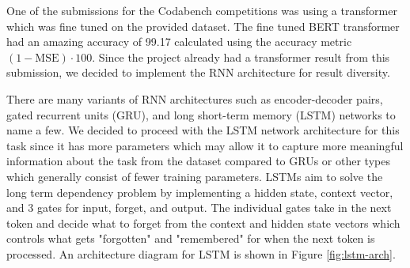 \documentclass[11pt]{article}
\begin{document}
One of the submissions for the Codabench competitions was using a transformer which was fine tuned on 
the provided dataset. The fine tuned BERT transformer had an amazing accuracy of 99.17 calculated using the
accuracy metric \((1 - \text{MSE}) \cdot 100\). Since the project already had a transformer result from
this submission, we decided to implement the RNN architecture for result diversity. 
\bigskip

There are many variants of RNN architectures such as encoder-decoder pairs, gated recurrent units (GRU), 
and long short-term memory (LSTM) networks to name a few. We decided to proceed with the LSTM network 
architecture for this task since it has more parameters which may allow it to capture more meaningful information 
about the task from the dataset compared to GRUs or other types which generally consist of fewer training
parameters. LSTMs aim to solve the long term dependency problem by implementing a hidden state, context vector, and 3 gates
for input, forget, and output. The individual gates take in the next token and decide what to forget from the 
context and hidden state vectors which controls what gets "forgotten" and "remembered" for when the next token is processed. An architecture diagram
for LSTM is shown in Figure \ref{fig:lstm-arch}.
\end{document}
